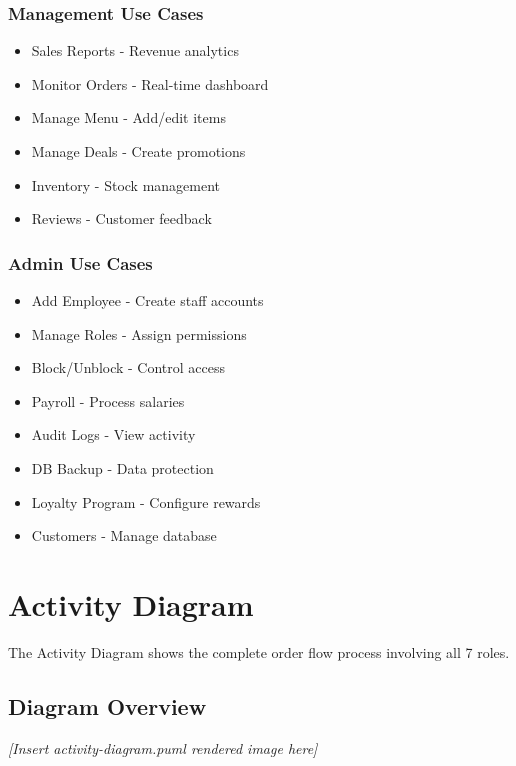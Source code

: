 \documentclass[12pt,a4paper]{article}
\begin{document}
\subsubsection{Management Use Cases}
\begin{itemize}
    \item Sales Reports - Revenue analytics
    \item Monitor Orders - Real-time dashboard
    \item Manage Menu - Add/edit items
    \item Manage Deals - Create promotions
    \item Inventory - Stock management
    \item Reviews - Customer feedback
\end{itemize}

\subsubsection{Admin Use Cases}
\begin{itemize}
    \item Add Employee - Create staff accounts
    \item Manage Roles - Assign permissions
    \item Block/Unblock - Control access
    \item Payroll - Process salaries
    \item Audit Logs - View activity
    \item DB Backup - Data protection
    \item Loyalty Program - Configure rewards
    \item Customers - Manage database
\end{itemize}

\section{Activity Diagram}

The Activity Diagram shows the complete order flow process involving all 7 roles.

\subsection{Diagram Overview}

\begin{center}
\textit{[Insert activity-diagram.puml rendered image here]}
\end{center}
\end{document}
